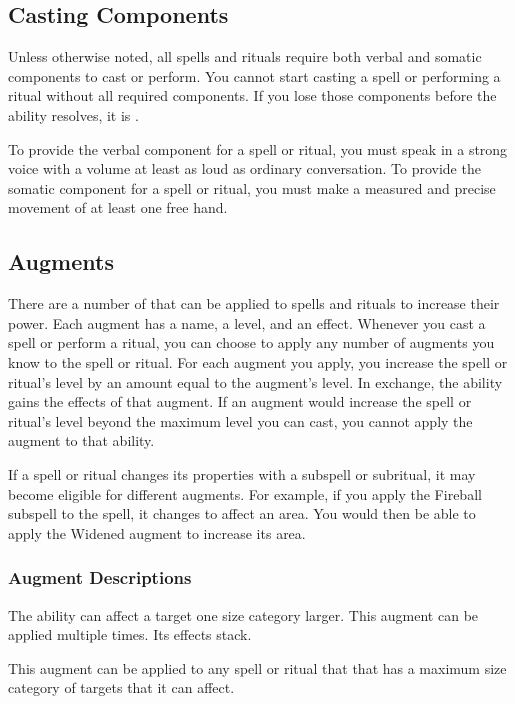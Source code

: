     \subsection{Casting Components}\label{Casting Components}
        Unless otherwise noted, all spells and rituals require both verbal and somatic components to cast or perform.
        You cannot start casting a spell or performing a ritual without all required components.
        If you lose those components before the ability resolves, it is .

        To provide the verbal component for a spell or ritual, you must speak in a strong voice with a volume at least as loud as ordinary conversation.
        To provide the somatic component for a spell or ritual, you must make a measured and precise movement of at least one free hand.

    \subsection{Augments}\label{Augments}
        There are a number of  that can be applied to spells and rituals to increase their power.
        Each augment has a name, a level, and an effect.
        Whenever you cast a spell or perform a ritual, you can choose to apply any number of augments you know to the spell or ritual.
        For each augment you apply, you increase the spell or ritual's level by an amount equal to the augment's level.
        In exchange, the ability gains the effects of that augment.
        If an augment would increase the spell or ritual's level beyond the maximum level you can cast, you cannot apply the augment to that ability.

        If a spell or ritual changes its properties with a subspell or subritual, it may become eligible for different augments.
        For example, if you apply the Fireball subspell to the  spell, it changes to affect an area.
        You would then be able to apply the Widened augment to increase its area.

        \subsubsection{Augment Descriptions}\label{Augment Descriptions}

             The ability can affect a target one size category larger.
            This augment can be applied multiple times.
            Its effects stack.
            \par This augment can be applied to any spell or ritual that that has a maximum size category of targets that it can affect.

